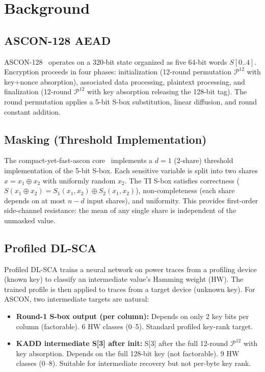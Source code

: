 \documentclass[a4paper,11pt,twocolumn]{article}
\begin{document}
\section{Background}

\subsection{ASCON-128 AEAD}

ASCON-128~\cite{ascon_spec} operates on a 320-bit state organized as five 64-bit words $S[0..4]$. Encryption proceeds in four phases: initialization (12-round permutation $\mathcal{P}^{12}$ with key+nonce absorption), associated data processing, plaintext processing, and finalization (12-round $\mathcal{P}^{12}$ with key absorption releasing the 128-bit tag). The round permutation applies a 5-bit S-box substitution, linear diffusion, and round constant addition.

\subsection{Masking (Threshold Implementation)}

The compact-yet-fast-ascon core~\cite{compact_ascon} implements a $d=1$ (2-share) threshold implementation of the 5-bit S-box. Each sensitive variable is split into two shares $x = x_1 \oplus x_2$ with uniformly random $x_2$. The TI S-box satisfies correctness ($S(x_1 \oplus x_2) = S_1(x_1, x_2) \oplus S_2(x_1, x_2)$), non-completeness (each share depends on at most $n-d$ input shares), and uniformity. This provides first-order side-channel resistance: the mean of any single share is independent of the unmasked value.

\subsection{Profiled DL-SCA}

Profiled DL-SCA trains a neural network on power traces from a profiling device (known key) to classify an intermediate value's Hamming weight (HW). The trained profile is then applied to traces from a target device (unknown key). For ASCON, two intermediate targets are natural:

\begin{itemize}[leftmargin=*,nosep]
\item \textbf{Round-1 S-box output (per column):} Depends on only 2 key bits per column (factorable). 6 HW classes (0--5). Standard profiled key-rank target.
\item \textbf{KADD intermediate S[3] after init:} S[3] after the full 12-round $\mathcal{P}^{12}$ with key absorption. Depends on the full 128-bit key (not factorable). 9 HW classes (0--8). Suitable for intermediate recovery but not per-byte key rank.
\end{itemize}
\end{document}
